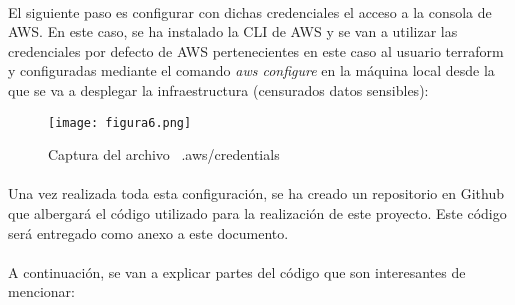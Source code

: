 \documentclass[../../memoria.tex]{subfiles}
\begin{document}
\paragraph{}
El siguiente paso es configurar con dichas credenciales el acceso a la consola de AWS. En este caso, se ha instalado la CLI de AWS \cite{awscli} y se van a utilizar las credenciales por defecto de AWS pertenecientes en este caso al usuario terraform y configuradas mediante el comando \textit{aws configure} en la máquina local desde la que se va a desplegar la infraestructura (censurados datos sensibles):

\begin{figure}[H]
    \centering
    \texttt{[image: figura6.png]}
    \caption{Captura del archivo ~.aws/credentials}
    \label{fig:figura6}
\end{figure}

\paragraph{}
Una vez realizada toda esta configuración, se ha creado un repositorio en Github que albergará el código utilizado para la realización de este proyecto\cite{repogithub}. Este código será entregado como anexo a este documento.

\paragraph{}
A continuación, se van a explicar partes del código que son interesantes de mencionar:
\end{document}
